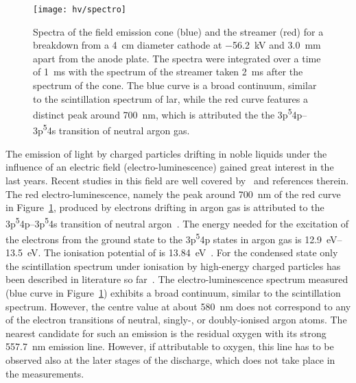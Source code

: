 \begin{figure}[tbp]
	\centering
	\texttt{[image: hv/spectro]}
	\caption[ study field emission and streamer spectra]{%
		Spectra of the field emission cone (blue) and the streamer (red) for a breakdown from a \SI{4}{\centi\metre} diameter cathode at \SI{-56.2}{\kilo\volt} and \SI{3.0}{\milli\metre} apart from the anode plate.
		The spectra were integrated over a time of \SI{1}{\milli\second} with the spectrum of the streamer taken \SI{2}{\milli\second} after the spectrum of the cone.
		The blue curve is a broad continuum, similar to the scintillation spectrum of \acrshort{lar}, while the red curve features a distinct peak around \SI{700}{\nano\metre}, which is attributed the the 3p\textsuperscript{5}4p--3p\textsuperscript{5}4s transition of neutral argon gas.
	}
	\label{fig:hv_spectro}
\end{figure}

The emission of light by charged particles drifting in noble liquids under the influence of an electric field (electro-luminescence) gained great interest in the last years.
Recent studies in this field are well covered by~\cite{buzulutskov1, buzulutskov2, buzulutskov3} and references therein.
The red electro-luminescence, namely the peak around \SI{700}{\nano\metre} of the red curve in Figure~\ref{fig:hv_spectro}, produced by electrons drifting in argon gas is attributed to the 3p\textsuperscript{5}4p--3p\textsuperscript{5}4s transition of neutral argon~\cite{Boffard}.
The energy needed for the excitation of the electrons from the ground state to the 3p\textsuperscript{5}4p states in argon gas is \SIrange{12.9}{13.5}{\electronvolt}.
The ionisation potential of \lar{} is \SI{13.84}{\electronvolt}~\cite{2photonAbs}.
For the condensed state only the scintillation spectrum under ionisation by high-energy charged particles has been described in literature so far~\cite{Heindl}.
The electro-luminescence spectrum measured (blue curve in Figure~\ref{fig:hv_spectro}) exhibits a broad continuum, similar to the scintillation spectrum.
However, the centre value at about \SI{580}{\nano\metre} does not correspond to any of the electron transitions of neutral, singly-, or doubly-ionised argon atoms.
The nearest candidate for such an emission is the residual oxygen with its strong \SI{557.7}{\nano\metre} emission line.
However, if attributable to oxygen, this line has to be observed also at the later stages of the discharge, which does not take place in the measurements.

